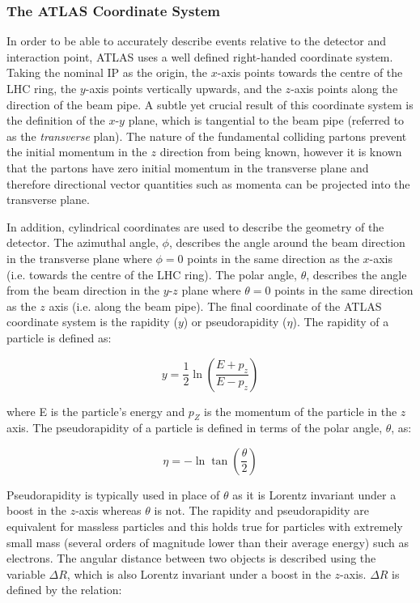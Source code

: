 \documentclass[12pt,a4paper,epsf,portrait,times,epsfig]{article}
\begin{document}
		\subsubsection{The ATLAS Coordinate System}

		In order to be able to accurately describe events relative to the detector and interaction point, ATLAS uses a well defined right-handed coordinate system. Taking the nominal IP as the origin, the $x$-axis points towards the centre of the LHC ring, the $y$-axis points vertically upwards, and the $z$-axis points along the direction of the beam pipe. A subtle yet crucial result of this coordinate system is the definition of the $x$-$y$ plane, which is tangential to the beam pipe (referred to as the \textit{transverse} plan). The nature of the fundamental colliding partons prevent the initial momentum in the $z$ direction from being known, however it is known that the partons have zero initial momentum in the transverse plane and therefore directional vector quantities such as momenta can be projected into the transverse plane. \par

		In addition, cylindrical coordinates are used to describe the geometry of the detector. The azimuthal angle, $\phi$, describes the angle around the beam direction in the transverse plane where $\phi = 0$ points in the same direction as the $x$-axis (i.e. towards the centre of the LHC ring). The polar angle, $\theta$, describes the angle from the beam direction in the $y$-$z$ plane where $\theta = 0$ points in the same direction as the $z$ axis (i.e. along the beam pipe). The final coordinate of the ATLAS coordinate system is the rapidity ($y$) or pseudorapidity ($\eta$). The rapidity of a particle is defined as: 

		\begin{equation}
			y = \frac{1}{2}\ln\left(\frac{E+p_{z}}{E-p_{z}}\right)
		\end{equation}

		where E is the particle's energy and $p_{Z}$ is the momentum of the particle in the $z$ axis. The pseudorapidity of a particle is defined in terms of the polar angle, $\theta$, as:

		\begin{equation}
			\eta = -\ln\tan\left(\frac{\theta}{2}\right)
		\end{equation}

		Pseudorapidity is typically used in place of $\theta$ as it is Lorentz invariant under a boost in the $z$-axis whereas $\theta$ is not. The rapidity and pseudorapidity are equivalent for massless particles and this holds true for particles with extremely small mass (several orders of magnitude lower than their average energy) such as electrons. The angular distance between two objects is described using the variable $\Delta R$, which is also Lorentz invariant under a boost in the $z$-axis. $\Delta R$ is defined by the relation:
\end{document}
